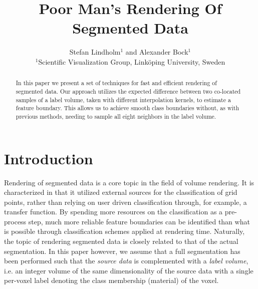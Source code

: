 \documentclass{egpubl}
\title[PMS]%
      {Poor Man's Rendering Of Segmented Data}
\author[S. Lindholm \& A. Bock]
       {Stefan Lindholm$^{1}$
        and Alexander Bock$^{1}$
        \\
         $^1$Scientific Visualization Group, Link\"{o}ping University, Sweden
       }
\begin{document}

\maketitle

\begin{abstract}
In this paper we present a set of techniques for fast and efficient rendering of segmented data. Our approach utilizes the expected difference between two co-located samples of a label volume, taken with different interpolation kernels, to estimate a feature boundary. This allows us to achieve smooth class boundaries without, as with previous methods, needing to sample all eight neighbors in the label volume. 

\begin{classification} %
\end{classification}

\end{abstract}




\def\myitem{\diamond}




\section{Introduction}

Rendering of segmented data is a core topic in the field of volume rendering. It is characterized in that it utilized external sources for the classification of grid points, rather than relying on user driven classification through, for example, a transfer function. By spending more resources on the classification as a pre-process step, much more reliable feature boundaries can be identified than what is possible through classification schemes applied at rendering time. Naturally, the topic of rendering segmented data is closely related to that of the actual segmentation. In this paper however, we assume that a full segmentation has been performed such that the \emph{source data} is complemented with a \emph{label volume}, i.e. an integer volume of the same dimensionality of the source data with a single per-voxel label denoting the class membership (material) of the voxel.
\end{document}
